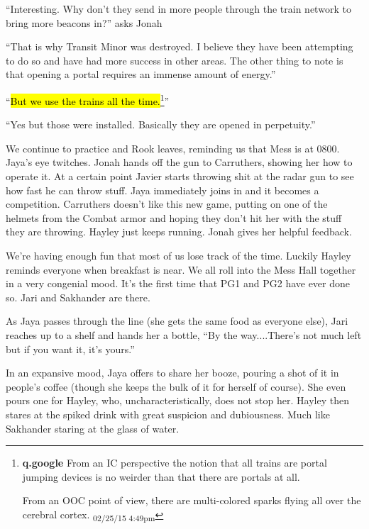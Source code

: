 ``Interesting.  Why don't they send in more people through the train network to bring more beacons in?'' asks Jonah

``That is why Transit Minor was destroyed.  I believe they have been attempting to do so and have had more success in other areas.  The other thing to note is that opening a portal requires an immense amount of energy.''

``\hl{But we use the trains all the time.}\footnote{\textbf{q.google }From an IC perspective the notion that all trains are portal jumping devices is no weirder than that there are portals at all.

From an OOC point of view, there are multi-colored sparks flying all over the cerebral cortex. \textsubscript{02/25/15 4:49pm}}''

``Yes but those were installed.  Basically they are opened in perpetuity.''

We continue to practice and Rook leaves, reminding us that Mess is at 0800.  Jaya's eye twitches.  Jonah hands off the gun to Carruthers, showing her how to operate it.  At a certain point Javier starts throwing shit at the radar gun to see how fast he can throw stuff.  Jaya immediately joins in and it becomes a competition.  Carruthers doesn't like this new game, putting on one of the helmets from the Combat armor and hoping they don't hit her with the stuff they are throwing.  Hayley just keeps running.  Jonah gives her helpful feedback.





We're having enough fun that most of us lose track of the time. Luckily Hayley reminds everyone when breakfast is near.  We all roll into the Mess Hall together in a very congenial mood.  It's the first time that PG1 and PG2 have ever done so.  Jari and Sakhander are there.



As Jaya passes through the line (she gets the same food as everyone else), Jari reaches up to a shelf and hands her a bottle, ``By the way....There's not much left but if you want it, it's yours.''



In an expansive mood, Jaya offers to share her booze, pouring a shot of it in people's coffee (though she keeps the bulk of it for herself of course).  She even pours one for Hayley, who, uncharacteristically, does not stop her.  Hayley then stares at the spiked drink with great suspicion and dubiousness.  Much like Sakhander staring at the glass of water.




